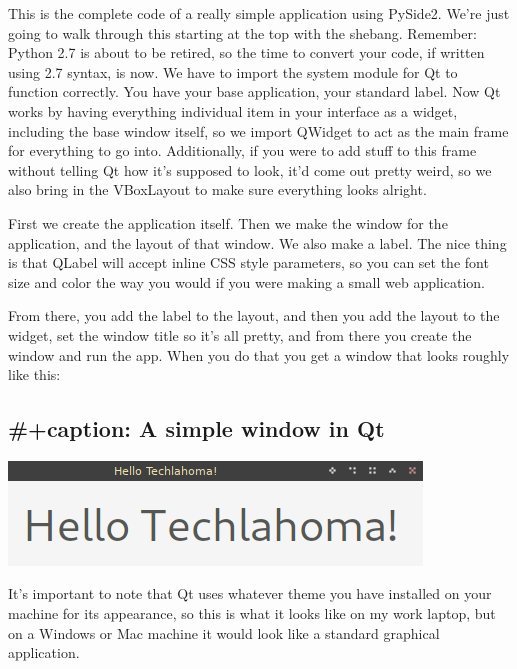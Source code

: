 \documentclass[11pt]{article}
\begin{document}
\begin{notes}
This is the complete code of a really simple application using PySide2. We're just going to walk through this starting at the top with the shebang. Remember: Python 2.7 is about to be retired, so the time to convert your code, if written using 2.7 syntax, is now. We have to import the system module for Qt to function correctly. You have your base application, your standard label. Now Qt works by having everything individual item in your interface as a widget, including the base window itself, so we import QWidget to act as the main frame for everything to go into. Additionally, if you were to add stuff to this frame without telling Qt how it's supposed to look, it'd come out pretty weird, so we also bring in the VBoxLayout to make sure everything looks alright.

First we create the application itself. Then we make the window for the application, and the layout of that window. We also make a label. The nice thing is that QLabel will accept inline CSS style parameters, so you can set the font size and color the way you would if you were making a small web application.

From there, you add the label to the layout, and then you add the layout to the widget, set the window title so it's all pretty, and from there you create the window and run the app. When you do that you get a window that looks roughly like this:
\end{notes}

\subsection{\#+caption: A simple window in Qt}
\label{sec:org566ccf3}
\begin{center}
\includegraphics[width=.9\linewidth]{Screenshot_2019-09-26_16-17-12.png}
\end{center}

\begin{notes}
It's important to note that Qt uses whatever theme you have installed on your machine for its appearance, so this is what it looks like on my work laptop, but on a Windows or Mac machine it would look like a standard graphical application.
\end{notes}
\end{document}
